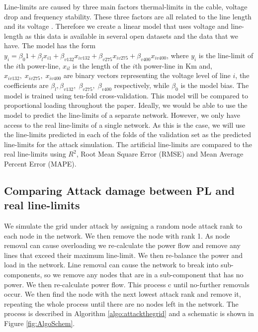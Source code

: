 \documentclass{article}
\begin{document}
Line-limits are caused by three main factors thermal-limits in the cable, voltage drop and frequency stability. These three factors are all related to the line length and its voltage \cite{Gutman1979}. Therefore we create a linear model that uses voltage and line-length as this data is available in several open datasets  \cite{Entsoe-e, Rivera2015,OpenStreetMapcontributors2017} and the data that we have. The model has the form $y_i = \beta_0 1 + \beta_l x_{i1} + \beta_{v132} x_{iv132}+ \beta_{v275} x_{iv275}+ \beta_{v400} x_{iv400}$, where $y_i$ is the line-limit of the $i$th power-line, $x_{il}$ is the length of the $i$th power-line in Km and, $x_{iv132},\; x_{iv275}, \; x_{iv400}$ are binary vectors representing the voltage level of line $i$, the coefficients are $\beta_l, \beta_{v132}, \; \beta_{v275}, \; \beta_{v400}$ respectively, while $\beta_0$ is the model bias. 
The model is trained using ten-fold cross-validation. This model will be compared to proportional loading throughout the paper. Ideally, we would be able to use the model to predict the line-limits of a separate network. However, we only have access to the real line-limits of a single network. As this is the case, we will use the line-limits predicted in each of the folds of the validation set as the predicted line-limits for the attack simulation. The artificial line-limits are compared to the real line-limits using $R^2$, Root Mean Square Error (RMSE) and Mean Average Percent Error (MAPE). 

\subsection{Comparing Attack damage between PL and real line-limits}
We simulate the grid under attack by assigning a random node attack rank to each node in the network. We then remove the node with rank 1. As node removal can cause overloading we re-calculate the power flow and remove any lines that exceed their maximum line-limit. We then re-balance the power and load in the network. Line removal can cause the network to break into sub-components, so we remove any nodes that are in a sub-component that has no power. We then re-calculate power flow. This process c until no-further removals occur. We then find the node with the next lowest attack rank and remove it, repeating the whole process until there are no nodes left in the network. The process is described in Algorithm \ref{algo:attackthegrid} and a schematic is shown in Figure \ref{fig:AlgoSchem}.
\end{document}
